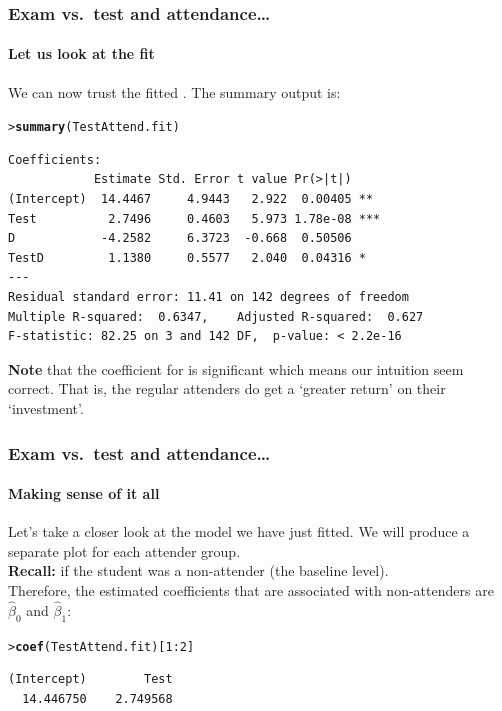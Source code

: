 \documentclass{beamer}\usepackage[]{graphicx}\usepackage[]{xcolor}
\makeatletter
\newcommand{\hlnum}[1]{\textcolor[rgb]{0.686,0.059,0.569}{#1}}%
\newcommand{\hlopt}[1]{\textcolor[rgb]{0,0,0}{#1}}%
\newcommand{\hlstd}[1]{\textcolor[rgb]{0.345,0.345,0.345}{#1}}%
\newcommand{\hlkwd}[1]{\textcolor[rgb]{0.737,0.353,0.396}{\textbf{#1}}}%
\newenvironment{kframe}{%
 \def\at@end@of@kframe{}%
 \ifinner\ifhmode%
  \def\at@end@of@kframe{\end{minipage}}%
  \begin{minipage}{\columnwidth}%
 \fi\fi%
 \def\FrameCommand##1{\hskip\@totalleftmargin \hskip-\fboxsep
 \colorbox{shadecolor}{##1}\hskip-\fboxsep
     \hskip-\linewidth \hskip-\@totalleftmargin \hskip\columnwidth}%
 \MakeFramed {\advance\hsize-\width
   \@totalleftmargin\z@ \linewidth\hsize
   \@setminipage}}%
 {\par\unskip\endMakeFramed%
 \at@end@of@kframe}
\newenvironment{knitrout}{}{} %
\makeatother
\begin{document}
\begin{frame}[fragile]
\frametitle{Exam vs.\ test \textbf{and} attendance\ldots}
\framesubtitle{Let us look at the fit}

\medskip
We can now trust the fitted .
The summary output is:

\begin{knitrout}\scriptsize
{}\color{fgcolor}\begin{kframe}
\begin{alltt}
\hlstd{> }\hlkwd{summary}\hlstd{(TestAttend.fit)}
\end{alltt}
\end{kframe}
\end{knitrout}

\begin{knitrout}\scriptsize
{}\color{fgcolor}\begin{kframe}
\begin{verbatim}
Coefficients:
            Estimate Std. Error t value Pr(>|t|)    
(Intercept)  14.4467     4.9443   2.922  0.00405 ** 
Test          2.7496     0.4603   5.973 1.78e-08 ***
D            -4.2582     6.3723  -0.668  0.50506    
TestD         1.1380     0.5577   2.040  0.04316 *  
---
Residual standard error: 11.41 on 142 degrees of freedom
Multiple R-squared:  0.6347,	Adjusted R-squared:  0.627 
F-statistic: 82.25 on 3 and 142 DF,  p-value: < 2.2e-16
\end{verbatim}
\end{kframe}
\end{knitrout}

\textbf{Note} that the coefficient for  is significant which means our 
intuition seem correct. That is, the regular attenders do get a `greater return' on their  `investment'.
\end{frame}


\begin{frame}[fragile]
\frametitle{Exam vs.\ test \textbf{and} attendance\ldots}
\framesubtitle{Making sense of it all}
Let's take a closer look at the model we have just fitted. We will produce a separate plot for each attender group.\\
\bigskip
\textbf{Recall:}  if the student was a non-attender (the baseline level).\\
\bigskip
Therefore, the estimated coefficients that are associated with non-attenders are $\hat{\beta}_0$ and $\hat{\beta}_1$:\\
\bigskip
\begin{knitrout}\scriptsize
{}\color{fgcolor}\begin{kframe}
\begin{alltt}
\hlstd{> }\hlkwd{coef}\hlstd{(TestAttend.fit)[}\hlnum{1}\hlopt{:}\hlnum{2}\hlstd{]}
\end{alltt}
\begin{verbatim}
(Intercept)        Test 
  14.446750    2.749568 
\end{verbatim}
\end{kframe}
\end{knitrout}
\end{frame}
\end{document}
